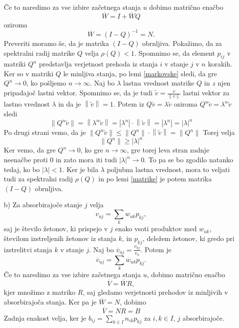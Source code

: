 \documentclass[twoside,11pt]{article}
\begin{document}
\begin{enumerate}
\noindent Če to naredimo za vse izbire začetnega stanja $u$ dobimo matrično enačbo
$$\overline{W} = I + \overline{W}Q$$
oziroma
$$\overline{W} = (I - Q)^{-1} = N.$$
Preveriti moramo še, da je matrika $(I-Q)$ obrnljiva. Pokažimo, da za spektralni radij matrike $Q$ velja $\rho(Q) < 1$. Spomnimo se, da element $p_{ij}$ v matriki $Q^n$ predstavlja verjetnost prehoda iz stanja $i$ v stanje $j$ v $n$ korakih. Ker so v matriki $Q$ le minljiva stanja, po lemi \ref{markovske} sledi, da gre $Q^n \rightarrow 0$, ko pošljemo $n\rightarrow \infty$. Naj bo $\lambda$ lastna vrednost matrike $Q$ in $z$ njen pripadajoč lastni vektor. 
Spomnimo se, da je tudi $\widetilde{v} = \frac{v}{\left\lVert v\right\rVert }$ lastni vektor za lastno vrednost $\lambda$ in da je $\left\lVert \widetilde{v}\right\rVert = 1$. Potem iz $Q\widetilde{v} = \lambda\widetilde{v}$ oziroma $Q^n\widetilde{v} = \lambda^n\widetilde{v}$ sledi
\[
    \left\lVert Q^n\widetilde{v} \right\rVert = \left\lVert \lambda^n\widetilde{v}\right\rVert = \left\lvert \lambda^n\right\rvert\cdot \left\lVert \widetilde{v}\right\rVert = \left\lvert \lambda^n\right\rvert = \left\lvert \lambda\right\rvert^n 
\]
Po drugi strani vemo, da je $\left\lVert Q^n\widetilde{v} \right\rVert\leq \left\lVert Q^n \right\rVert \cdot \left\lVert \widetilde{v} \right\rVert = \left\lVert Q^n \right\rVert$
Torej velja
$$ \left\lVert Q^n \right\rVert \geq \left\lvert \lambda\right\rvert^n$$
Ker vemo, da gre $Q^n \rightarrow 0$, ko gre $n \rightarrow \infty$, gre torej leva stran zadnje neenačbe proti 0 in zato mora iti tudi $\left\lvert \lambda \right\rvert^n \rightarrow 0$. To pa se bo zgodilo natanko tedaj, ko bo $\left\lvert \lambda \right\rvert < 1$. Ker je bila $\lambda$ poljubna lastna vrednost, mora to veljati tudi za spektralni radij $\rho(Q)$ in po lemi \ref{matrike} je potem matrika $(I-Q)$ obrnljiva.

\item[b)] Za absorbirajoče stanje $j$ velja
$$v_{uj} = \sum_{k} w_{uk}p_{kj},$$
saj je število žetonov, ki prispejo v $j$ enako vsoti produktov med $w_{uk}$, številom izstreljenih žetonov iz stanja $k$, in $p_{kj}$, deležem žetonov, ki gredo pri izstrelitvi stanja $k$ v stanje $j$. \newline
Naj bo $\overline{v}_{uj} = \frac{v_{uj}}{v_{u}}$. Potem je
$$ \overline{v}_{uj} = \sum_{k} \overline{w}_{uk}p_{kj}.$$
Če to naredimo za vse izbire začetnega stanja $u$, dobimo matrično enačbo
$$\overline{V} = \overline{W}R,$$
kjer množimo z matriko $R$, saj gledamo verjetnosti prehodov iz minljivih v absorbirajoča stanja.
Ker pa je $\overline{W} = N$, dobimo 
$$\overline{V} = NR = B $$
Zadnja enakost velja, ker je $b_{ij} = \sum_{k\in I} n_{ik}p_{kj}$ za $i,k \in I$, $j$ absorbirajoče.

\hfill \QED
\end{enumerate}
\end{document}
